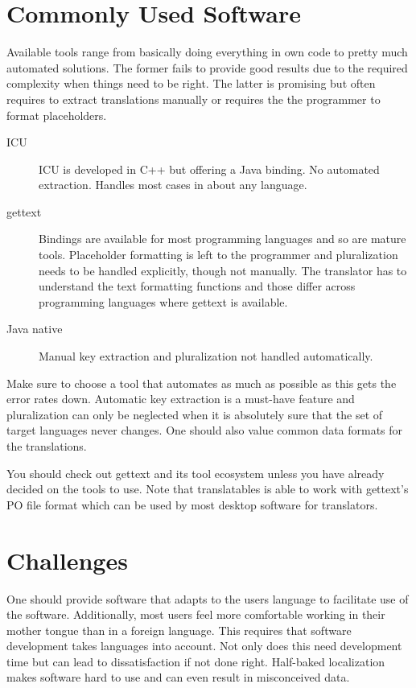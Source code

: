 \documentclass[a4paper,11pt,twoside]{report}
\begin{document}
\section{Commonly Used Software}
Available tools range from basically doing everything in own code to pretty much automated solutions. The former fails to provide good results due to the required complexity when things need to be right. The latter is promising but often requires to extract translations manually or requires the the programmer to format placeholders.
\begin{description}
	\item[ICU] \ac{ICU} is developed in C++ but offering a Java binding. No automated extraction. Handles most cases in about any language.
	\item[gettext] Bindings are available for most programming languages and so are mature tools. Placeholder formatting is left to the programmer and pluralization needs to be handled explicitly, though not manually. The translator has to understand the text formatting functions and those differ across programming languages where gettext is available.
	\item[Java native] Manual key extraction and pluralization not handled automatically.
\end{description}
Make sure to choose a tool that automates as much as possible as this gets the error rates down. Automatic key extraction is a must-have feature and pluralization can only be neglected when it is absolutely sure that the set of target languages never changes. One should also value common data formats for the translations.

You should check out gettext and its tool ecosystem unless you have already decided on the tools to use. Note that translatables is able to work with gettext's \ac{PO} file format which can be used by most desktop software for translators.

\section{Challenges}
One should provide software that adapts to the users language to facilitate use of the software. Additionally, most users feel more comfortable working in their mother tongue than in a foreign language. This requires that software development takes languages into account. Not only does this need development time but can lead to dissatisfaction if not done right. Half-baked localization makes software hard to use and can even result in misconceived data.
\end{document}
